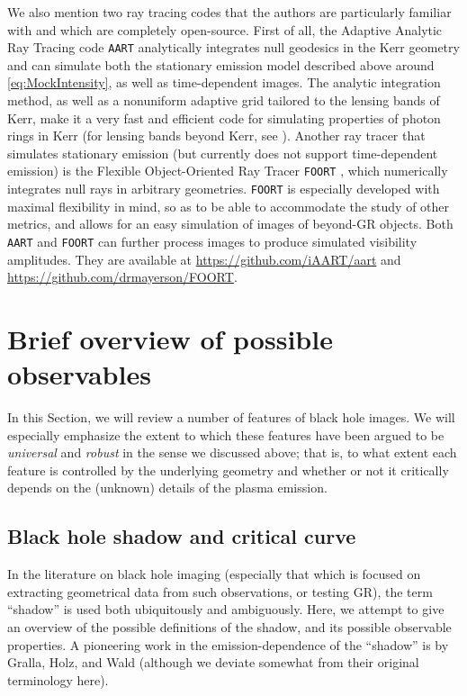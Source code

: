 \documentclass[graybox,envcountchap]{svmult}
\begin{document}
We also mention two ray tracing codes that the authors are particularly familiar with and which are completely open-source.
First of all, the Adaptive Analytic Ray Tracing code \texttt{AART} \cite{CardenasAvendano2022} analytically integrates null geodesics in the Kerr geometry and can simulate both the stationary emission model described above around \eqref{eq:MockIntensity}, as well as time-dependent images.
The analytic integration method, as well as a nonuniform adaptive grid tailored to the lensing bands of Kerr, make it a very fast and efficient code for simulating properties of photon rings in Kerr (for lensing bands beyond Kerr, see \cite{CardenasAvendano2024}).
Another ray tracer that simulates stationary emission (but currently does not support time-dependent emission) is the Flexible Object-Oriented Ray Tracer \texttt{FOORT} \cite{FOORT}, which numerically integrates null rays in arbitrary geometries. \texttt{FOORT} is especially developed with maximal flexibility in mind, so as to be able to accommodate the study of other metrics, and allows for an easy simulation of images of beyond-GR objects.
Both \texttt{AART} and \texttt{FOORT} can further process images to produce simulated visibility amplitudes.
They are available at \url{https://github.com/iAART/aart} and \url{https://github.com/drmayerson/FOORT}.

\section{Brief overview of possible observables}
\label{sec:Observables}

In this Section, we will review a number of features of black hole images.
We will especially emphasize the extent to which these features have been argued to be \emph{universal} and \emph{robust} in the sense we discussed above; that is, to what extent each feature is controlled by the underlying geometry and whether or not it critically depends on the (unknown) details of the plasma emission.

\subsection{Black hole shadow and critical curve}
\label{sec:Shadow}

In the literature on black hole imaging (especially that which is focused on extracting geometrical data from such observations, or testing GR), the term ``shadow'' is used both ubiquitously and ambiguously.
Here, we attempt to give an overview of the possible definitions of the shadow, and its possible observable properties.
A pioneering work in the emission-dependence of the ``shadow'' is by Gralla, Holz, and Wald \cite{Gralla2019} (although we deviate somewhat from their original terminology here).
\end{document}
